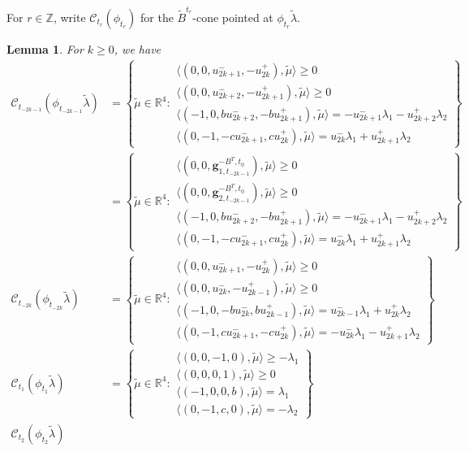 \documentclass{amsart}
\newtheorem{lemma}[theorem]{Lemma}
\numberwithin{theorem}{section}
\newcommand{\bfg}{\boldsymbol{g}}
\newcommand{\cC}{\mathcal{C}}
\newcommand{\RR}{\mathbb{R}}
\newcommand{\ZZ}{\mathbb{Z}}
\begin{document}
  For $r\in\ZZ$, write $\cC_{t_r}(\phi_{t_r})$ for the $\tilde B^{t_r}$-cone pointed at $\phi_{t_r}\tilde\lambda$.
  \begin{lemma}
    For $k\ge0$, we have
    \begin{align*}
      \cC_{t_{-2k-1}}(\phi_{t_{-2k-1}}\tilde\lambda)
      &=
      \left\{\tilde\mu\in\RR^4:
      \substack{
        \langle(0,0,u^-_{2k+1},-u^+_{2k}),\tilde\mu\rangle\ge0\\
        \langle(0,0,u^-_{2k+2},-u^+_{2k+1}),\tilde\mu\rangle\ge0\\
        \langle(-1,0,bu^-_{2k+2},-bu^+_{2k+1}),\tilde\mu\rangle=-u^-_{2k+1}\lambda_1-u^+_{2k+2}\lambda_2\\
        \langle(0,-1,-cu^-_{2k+1},cu^+_{2k}),\tilde\mu\rangle=u^-_{2k}\lambda_1+u^+_{2k+1}\lambda_2
      }\right\}\\
      &=
      \left\{\tilde\mu\in\RR^4:
      \substack{
        \langle(0,0,\bfg^{-B^T,t_0}_{1,t_{-2k-1}}),\tilde\mu\rangle\ge0\\
        \langle(0,0,\bfg^{-B^T,t_0}_{2,t_{-2k-1}}),\tilde\mu\rangle\ge0\\
        \langle(-1,0,bu^-_{2k+2},-bu^+_{2k+1}),\tilde\mu\rangle=-u^-_{2k+1}\lambda_1-u^+_{2k+2}\lambda_2\\
        \langle(0,-1,-cu^-_{2k+1},cu^+_{2k}),\tilde\mu\rangle=u^-_{2k}\lambda_1+u^+_{2k+1}\lambda_2
      }\right\}\\
      \cC_{t_{-2k}}(\phi_{t_{-2k}}\tilde\lambda)
      &=
      \left\{\tilde\mu\in\RR^4:
      \substack{
        \langle(0,0,u^-_{2k+1},-u^+_{2k}),\tilde\mu\rangle\ge0\\
        \langle(0,0,u^-_{2k},-u^+_{2k-1}),\tilde\mu\rangle\ge0\\
        \langle(-1,0,-bu^-_{2k},bu^+_{2k-1}),\tilde\mu\rangle=u^-_{2k-1}\lambda_1+u^+_{2k}\lambda_2\\
        \langle(0,-1,cu^-_{2k+1},-cu^+_{2k}),\tilde\mu\rangle=-u^-_{2k}\lambda_1-u^+_{2k+1}\lambda_2
      }\right\}\\
      \cC_{t_1}(\phi_{t_1}\tilde\lambda)
      &=
      \left\{\tilde\mu\in\RR^4:
      \substack{
        \langle(0,0,-1,0),\tilde\mu\rangle\ge -\lambda_1\\
        \langle(0,0,0,1),\tilde\mu\rangle\ge0\\
        \langle(-1,0,0,b),\tilde\mu\rangle=\lambda_1\\
        \langle(0,-1,c,0),\tilde\mu\rangle=-\lambda_2
      }\right\}\\
      \cC_{t_2}(\phi_{t_2}\tilde\lambda)

\end{align*}
\end{lemma}
\end{document}
